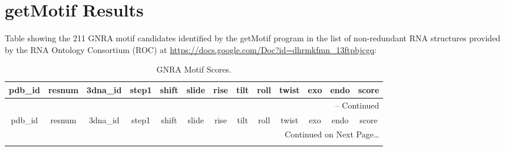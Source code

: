 \chapter{getMotif Results}
\label{appendix5a}
  Table showing the  211 GNRA  motif candidates
identified by  the getMotif program  in the list of  non-redundant RNA
structures  provided   by  the   RNA  Ontology  Consortium   (ROC)  at
\url{https://docs.google.com/Doc?id=dhrmkfmn_13ftpbjcgq}:
\scriptsize{
\begin{center}
\begin{longtable}{|c|c|c|c|c|c|c|c|c|c|c|c|c|}
\caption{GNRA Motif Scores.}
\label{tab:gnrascores}\\
\hline
pdb\_id & resnum & 3dna\_id & step1 &  shift & slide & rise & tilt & roll
& twist & exo & endo & score \\ \hline \hline
\endfirsthead

\multicolumn{13}{r}{{\tablename} \thetable{} -- Continued} \\
\hline
pdb\_id & resnum & 3dna\_id & step1 &  shift & slide & rise & tilt & roll
& twist & exo & endo & score \\ \hline \hline
\endhead

\multicolumn{13}{r}{Continued on Next Page\ldots} \\
\endfoot
\endlastfoot


\end{longtable}
\end{center}}
